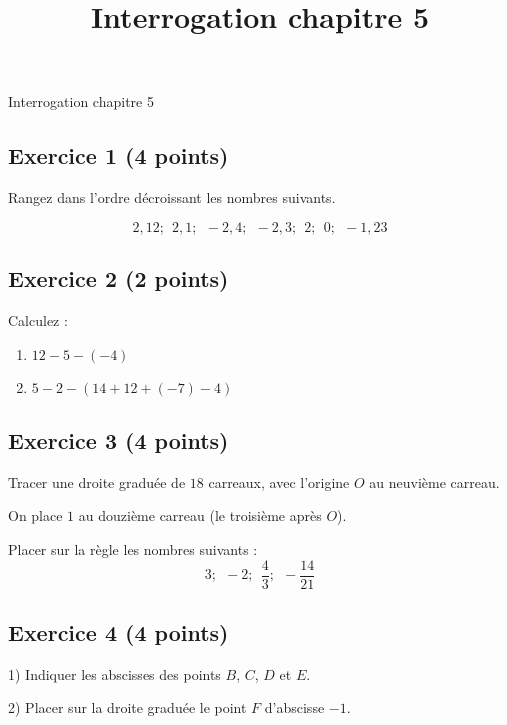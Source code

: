 \documentclass[14pt]{extreport}
\title{Interrogation chapitre 5}
\date{}
\theoremstyle{plain}
\begin{document}
\begin{center}{\Large Interrogation chapitre 5}\end{center}



\subsection*{Exercice 1 (4 points)}
 
 Rangez dans l'ordre décroissant les nombres suivants. 
 

\[ 2,12 ; \ \ 2,1 ; \ \ -2,4 ; \ \ -2,3 ; \ \ 2 ; \ \ 0 ; \ \ -1,23 \]
 
 
 
\subsection*{Exercice 2 (2 points)}
 
 Calculez : \begin{enumerate}
 \item $12 - 5 - (-4) $
 \item $ 5 - 2 - (14 + 12 + ( -7) - 4) $
 \end{enumerate}
 
\subsection*{Exercice 3 (4 points)}
Tracer une droite graduée de $18$ carreaux, avec l'origine $O$ au neuvième carreau. 

On place $1$ au douzième carreau (le troisième après $O$). 

Placer sur la règle les nombres suivants :
\[ 3 ; \ \ -2 ; \ \ \frac43 ; \ \ -\frac{14}{21}\]



\subsection*{Exercice 4 (4 points)} 
 
1) Indiquer les abscisses des points $B$, $C$, $D$ et $E$.
 
2) Placer sur la droite graduée le point $F$ d'abscisse $-1$. 
\end{document}
